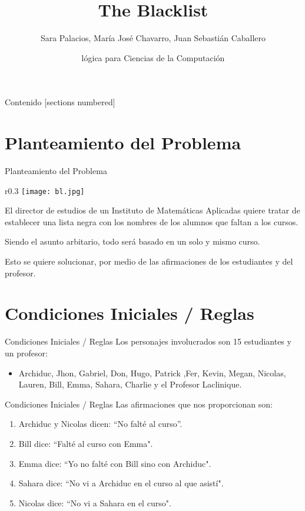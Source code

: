 \documentclass[10pt]{beamer}
\title{The Blacklist}
\date{lógica para Ciencias de la Computación}
\author{Sara Palacios, María José Chavarro, Juan Sebastián Caballero }
\institute{Universidad del Rosario}
\begin{document}
\maketitle

\begin{frame}{Contenido}
  [sections numbered]
  \tableofcontents[hideallsubsections]
\end{frame}

\section{Planteamiento del Problema}

\begin{frame}[fragile]{Planteamiento del Problema}
\begin{wrapfigure}{r}{0.3\textwidth}
	\centering
	\texttt{[image: bl.jpg]}		
\end{wrapfigure}
    
    El director de estudios de un Instituto de Matemáticas Aplicadas quiere tratar de establecer una lista negra con los nombres de los alumnos que faltan a los cursos.
    
    Siendo el asunto arbitario, todo será basado en un solo y mismo curso.
    
    Esto se quiere solucionar, por medio de las afirmaciones de los estudiantes y del profesor.

 
\end{frame}

\section{Condiciones Iniciales / Reglas }
\begin{frame}[fragile]{Condiciones Iniciales / Reglas}
    Los personajes involucrados son 15 estudiantes y un profesor:
    \begin{itemize}
        \item Archiduc, Jhon, Gabriel, Don, Hugo, Patrick ,Fer, Kevin, Megan, Nicolas, Lauren, Bill, Emma, Sahara, Charlie y el Profesor Laclinique.   
    \end{itemize}
\end{frame}

\begin{frame}[fragile]{Condiciones Iniciales / Reglas}
    Las afirmaciones que nos proporcionan son: 
    \begin{enumerate}
        \item Archiduc y Nicolas dicen: \textquotedblleft No falté al curso\textquotedblright.
        \item Bill dice: \textquotedblleft Falté al curso con Emma".
        \item Emma dice: \textquotedblleft Yo no falté con Bill sino con Archiduc".
        \item Sahara dice: \textquotedblleft No vi a Archiduc en el curso al que asistí".
        \item Nicolas dice: \textquotedblleft No vi a Sahara en el curso".
    \end{enumerate}
\end{frame}
\end{document}
